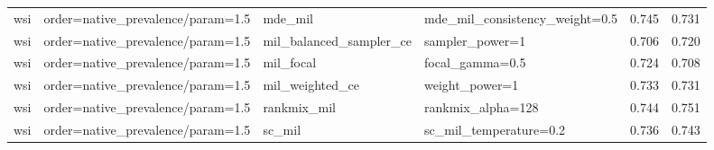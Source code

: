 \begin{tabular}{llllrr}
wsi & order=native_prevalence/param=1.5 & mde_mil & mde_mil_consistency_weight=0.5 & 0.745 & 0.731\\
wsi & order=native_prevalence/param=1.5 & mil_balanced_sampler_ce & sampler_power=1 & 0.706 & 0.720\\
wsi & order=native_prevalence/param=1.5 & mil_focal & focal_gamma=0.5 & 0.724 & 0.708\\
wsi & order=native_prevalence/param=1.5 & mil_weighted_ce & weight_power=1 & 0.733 & 0.731\\
wsi & order=native_prevalence/param=1.5 & rankmix_mil & rankmix_alpha=128 & 0.744 & 0.751\\
wsi & order=native_prevalence/param=1.5 & sc_mil & sc_mil_temperature=0.2 & 0.736 & 0.743\\
\bottomrule
\end{tabular}
